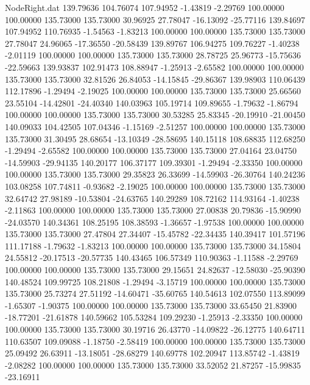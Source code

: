 \begin{filecontents}{NodeRight.dat}
 139.79636  104.76074  107.94952    -1.43819   -2.29769  100.00000  100.00000  135.73000  135.73000   30.96925   27.78047  -16.13092  -25.77116
 139.84697  107.94952  110.76935    -1.54563   -1.83213  100.00000  100.00000  135.73000  135.73000   27.78047   24.96065  -17.36550  -20.58439
 139.89767  106.94275  109.76227    -1.40238   -2.01119  100.00000  100.00000  135.73000  135.73000   28.78725   25.96773  -15.75636  -22.59663
 139.93837  102.91473  108.88947    -1.25913   -2.65582  100.00000  100.00000  135.73000  135.73000   32.81526   26.84053  -14.15845  -29.86367
 139.98903  110.06439  112.17896    -1.29494   -2.19025  100.00000  100.00000  135.73000  135.73000   25.66560   23.55104  -14.42801  -24.40340
 140.03963  105.19714  109.89655    -1.79632   -1.86794  100.00000  100.00000  135.73000  135.73000   30.53285   25.83345  -20.19910  -21.00450
 140.09033  104.42505  107.04346    -1.15169   -2.51257  100.00000  100.00000  135.73000  135.73000   31.30495   28.68654  -13.10349  -28.58695
 140.15118  108.68835  112.68250    -1.29494   -2.65582  100.00000  100.00000  135.73000  135.73000   27.04164   23.04750  -14.59903  -29.94135
 140.20177  106.37177  109.39301    -1.29494   -2.33350  100.00000  100.00000  135.73000  135.73000   29.35823   26.33699  -14.59903  -26.30764
 140.24236  103.08258  107.74811    -0.93682   -2.19025  100.00000  100.00000  135.73000  135.73000   32.64742   27.98189  -10.53804  -24.63765
 140.29289  108.72162  114.93164    -1.40238   -2.11863  100.00000  100.00000  135.73000  135.73000   27.00838   20.79836  -15.90990  -24.03570
 140.34361  108.25195  108.38593    -1.36657   -1.97538  100.00000  100.00000  135.73000  135.73000   27.47804   27.34407  -15.45782  -22.34435
 140.39417  101.57196  111.17188    -1.79632   -1.83213  100.00000  100.00000  135.73000  135.73000   34.15804   24.55812  -20.17513  -20.57735
 140.43465  106.57349  110.90363    -1.11588   -2.29769  100.00000  100.00000  135.73000  135.73000   29.15651   24.82637  -12.58030  -25.90390
 140.48524  109.99725  108.21808    -1.29494   -3.15719  100.00000  100.00000  135.73000  135.73000   25.73274   27.51192  -14.60471  -35.60765
 140.54613  102.07550  113.89099    -1.65307   -1.90375  100.00000  100.00000  135.73000  135.73000   33.65450   21.83900  -18.77201  -21.61878
 140.59662  105.53284  109.29230    -1.25913   -2.33350  100.00000  100.00000  135.73000  135.73000   30.19716   26.43770  -14.09822  -26.12775
 140.64711  110.63507  109.09088    -1.18750   -2.58419  100.00000  100.00000  135.73000  135.73000   25.09492   26.63911  -13.18051  -28.68279
 140.69778  102.20947  113.85742    -1.43819   -2.08282  100.00000  100.00000  135.73000  135.73000   33.52052   21.87257  -15.99835  -23.16911

\end{filecontents}

